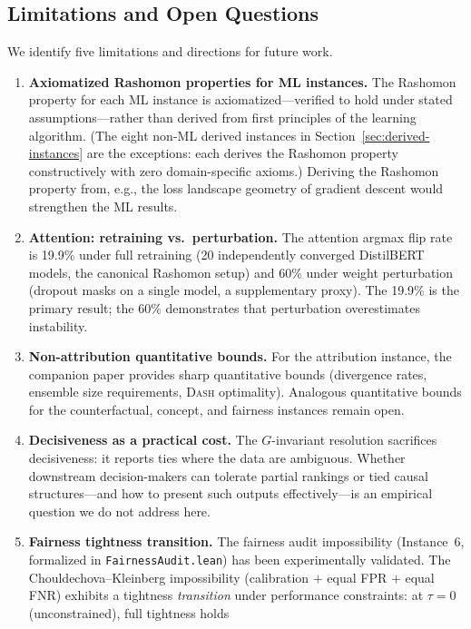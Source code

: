 \documentclass[11pt,a4paper]{article}
\newcommand{\DASH}{\textsc{Dash}}
\begin{document}
\subsection{Limitations and Open Questions}
\label{sec:limitations}

We identify five limitations and directions for future work.
\begin{enumerate}[label=(\arabic*)]
  \item \textbf{Axiomatized Rashomon properties for ML instances.}  The
    Rashomon property for each ML instance is axiomatized---verified to hold
    under stated assumptions---rather than derived from first principles of the
    learning algorithm.  (The eight non-ML derived instances in
    Section~\ref{sec:derived-instances} are the exceptions: each derives the
    Rashomon property constructively with zero domain-specific axioms.)  Deriving the Rashomon
    property from, e.g., the loss landscape geometry of gradient descent would
    strengthen the ML results.
  \item \textbf{Attention: retraining vs.\ perturbation.}  The attention
    argmax flip rate is 19.9\% under full retraining (20 independently
    converged DistilBERT models, the canonical Rashomon setup) and 60\%
    under weight perturbation (dropout masks on a single model, a
    supplementary proxy).  The 19.9\% is the primary result; the 60\%
    demonstrates that perturbation overestimates instability.
  \item \textbf{Non-attribution quantitative bounds.}  For the attribution
    instance, the companion paper provides sharp quantitative bounds (divergence
    rates, ensemble size requirements, \DASH{} optimality).  Analogous
    quantitative bounds for the counterfactual, concept, and fairness instances
    remain open.
  \item \textbf{Decisiveness as a practical cost.}  The $G$-invariant
    resolution sacrifices decisiveness: it reports ties where the data are
    ambiguous.  Whether downstream decision-makers can tolerate partial rankings
    or tied causal structures---and how to present such outputs
    effectively---is an empirical question we do not address here.
  \item \textbf{Fairness tightness transition.}  The fairness
    audit impossibility (Instance~6, formalized in \texttt{FairnessAudit.lean})
    has been experimentally validated.  The Chouldechova--Kleinberg impossibility
    (calibration $+$ equal FPR $+$ equal FNR) exhibits a tightness \emph{transition}
    under performance constraints: at $\tau = 0$ (unconstrained), full tightness holds

\end{enumerate}
\end{document}

